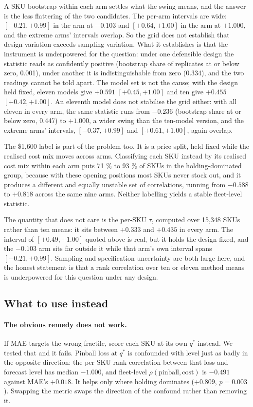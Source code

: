 \documentclass[11pt]{article}
\begin{document}
A SKU bootstrap within each arm settles what the swing means, and the answer
is the less flattering of the two candidates. The per-arm intervals are wide:
$[-0.21, +0.99]$ in the arm at $-0.103$ and $[+0.64, +1.00]$ in the arm at
$+1.000$, and the extreme arms' intervals overlap. So the grid does not
establish that design variation exceeds sampling variation. What it
establishes is that the instrument is underpowered for the question: under one
defensible design the statistic reads as confidently positive (bootstrap share
of replicates at or below zero, 0.001), under another it is indistinguishable
from zero (0.334), and the two readings cannot be told apart. The model set is
not the cause; with the design held fixed, eleven models give $+0.591$
$[+0.45, +1.00]$ and ten give $+0.455$ $[+0.42, +1.00]$. An eleventh model
does not stabilise the grid either: with all eleven in every arm, the same
statistic runs from $-0.236$ (bootstrap share at or below zero, 0.447) to
$+1.000$, a wider swing than the ten-model version, and the extreme arms'
intervals, $[-0.37, +0.99]$ and $[+0.61, +1.00]$, again overlap.

The \$1{,}600 label is part of the problem too. It is a price split, held
fixed while the realised cost mix moves across arms. Classifying each SKU
instead by its realised cost mix within each arm puts 71 \% to 93 \% of SKUs
in the holding-dominated group, because with these opening positions most SKUs
never stock out, and it produces a different and equally unstable set of
correlations, running from $-0.588$ to $+0.818$ across the same nine arms.
Neither labelling yields a stable fleet-level statistic.

The quantity that does not care is the per-SKU $\tau$, computed over 15{,}348
SKUs rather than ten means: it sits between $+0.333$ and $+0.435$ in every
arm. The interval of $[+0.49, +1.00]$ quoted above is real, but it holds the
design fixed, and the $-0.103$ arm sits far outside it while that arm's own
interval spans $[-0.21, +0.99]$. Sampling and specification uncertainty are
both large here, and the honest statement is that a rank correlation over ten
or eleven method means is underpowered for this question under any design.

\subsection{What to use instead}

\paragraph{The obvious remedy does not work.} If MAE targets the wrong
fractile, score each SKU at its own $q^\ast$ instead. We tested that and it
fails. Pinball loss at $q^\ast$ is confounded with level just as badly in the
opposite direction: the per-SKU rank correlation between that loss and forecast
level has median $\mathbf{-1.000}$, and fleet-level $\rho(\text{pinball},
\text{cost})$ is $\mathbf{-0.491}$ against MAE's $+0.018$. It helps only where
holding dominates ($+0.809$, $p = 0.003$). Swapping the metric swaps the
direction of the confound rather than removing it.
\end{document}
